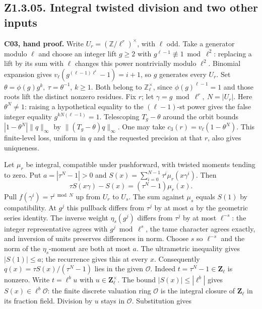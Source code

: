 \subsection{Z1.3.05. Integral twisted division and two other inputs}\label{r7:Z1.3.05}
\textbf{C03, hand proof.} Write \(U_r=(\mathbb Z/\ell^r)^\times\), with
\(\ell\) odd. Take a generator modulo \(\ell\) and choose an integer
lift \(g\ge2\) with \(g^{\ell-1}\not\equiv1\bmod\ell^2\): replacing
a lift by its sum with \(\ell\) changes this power nontrivially modulo
\(\ell^2\). Binomial expansion gives \(v_\ell(g^{(\ell-1)\ell^i}-1)=i+1\),
so \(g\) generates every \(U_r\). Set
\(\theta=\phi(g)g^k,\ \tau=\theta^{-1}\), \(k\ge1\).
Both belong to \(\mathbb Z_\ell^\times\), since \(\phi(g)^{\ell-1}=1\)
and those roots lift the distinct nonzero residues. Fix \(r\);
let \(\gamma=g\bmod\ell^r,\ N=|U_r|\). Here \(\theta^N\ne1\):
raising a hypothetical equality to the \((\ell-1)\)-st power gives
the false integer equality \(g^{kN(\ell-1)}=1\).
Telescoping \(T_g-\theta\) around the orbit bounds
\(|1-\theta^N|\|q\|_\infty\) by \(\|(T_g-\theta)q\|_\infty\).
One may take \(c_3(r)=v_\ell(1-\theta^N)\). This finite-level loss, uniform in \(q\) and the requested precision at that \(r\), also gives uniqueness.
\par Let \(\mu_r\) be integral, compatible under pushforward, with
twisted moments tending to zero. Put \(a=|\tau^N-1|>0\) and
\(S(x)=\sum_{i=0}^{N-1}\tau^i\mu_r(x\gamma^i)\). Then
\[
 \tau S(x\gamma)-S(x)=(\tau^N-1)\mu_r(x).
\]
Pull \(f(\gamma^i)=\tau^{i\bmod N}\) up from \(U_r\) to \(U_s\).
The sum against \(\mu_s\) equals \(S(1)\) by compatibility. At \(g^j\)
this pullback differs from \(\tau^j\) by at most \(a\) by the geometric
series identity. The inverse weight \(\eta_s(g^j)\) differs from
\(\tau^j\) by at most \(\ell^{-s}\): the integer representative agrees
with \(g^j\bmod\ell^s\), the tame character agrees exactly, and inversion
of units preserves differences in norm. Choose \(s\) so \(\ell^{-s}\)
and the norm of the \(\eta_s\)-moment are both at most \(a\).
The ultrametric inequality gives \(|S(1)|\le a\); the recurrence
gives this at every \(x\). Consequently \(q(x)=\tau S(x)/(\tau^N-1)\)
lies in the given \(\mathcal O\). Indeed \(t=\tau^N-1\in\mathbf Z_\ell\) is nonzero. Write \(t=\ell^b u\) with \(u\in\mathbf Z_\ell^\times\).
The bound \(|S(x)|\le|\ell^b|\) gives \(S(x)\in\ell^b\mathcal O\): the finite discrete valuation ring \(\mathcal O\) is the integral closure of \(\mathbf Z_\ell\) in its fraction field. Division by \(u\) stays in \(\mathcal O\). Substitution gives
